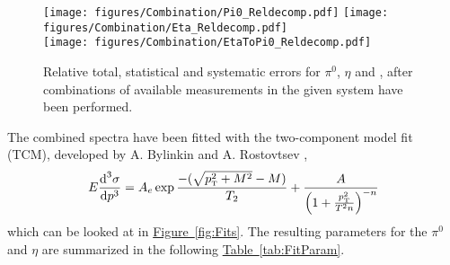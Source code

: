  		\begin{figure}[h]
 			\centering
 			\texttt{[image: figures/Combination/Pi0\_Reldecomp.pdf]}
 			\texttt{[image: figures/Combination/Eta\_Reldecomp.pdf]}\\
 			\texttt{[image: figures/Combination/EtaToPi0\_Reldecomp.pdf]}
 			\caption{Relative total, statistical and systematic errors for $\pi^0$, $\eta$ and \EtaToPi, after combinations of available measurements in the given system have been performed.}
 			\label{fig:combTotErr}
 		\end{figure}
%
%
 The combined spectra have been fitted with the two-component model fit (\acs{TCM}), developed by A. Bylinkin and A. Rostovtsev \cite{Bylinkin2012bz,Bylinkin2011yi,Bylinkin2015xya},
 		\begin{eqnarray}
 			E \frac{\mbox{d}^3 \sigma}{\mbox{d}p^3} = A_e \exp{\frac{-(\sqrt{p_{\text{\tiny T}}^2 + M^2} - M)}{T_{2}}} + \frac{A}{\left( 1+ \frac{p_{\text{\tiny T}}^2}{T^2 n}\right)^{-n}}
 			\label{eq:TwoComponentModel}
 		\end{eqnarray}
 which can be looked at in \hyperref[fig:Fits]{Figure~\ref*{fig:Fits}}. The resulting parameters for the $\pi^0$ and $\eta$ are summarized in the following \hyperref[tab:fitParam]{Table~\ref*{tab:FitParam}}.

